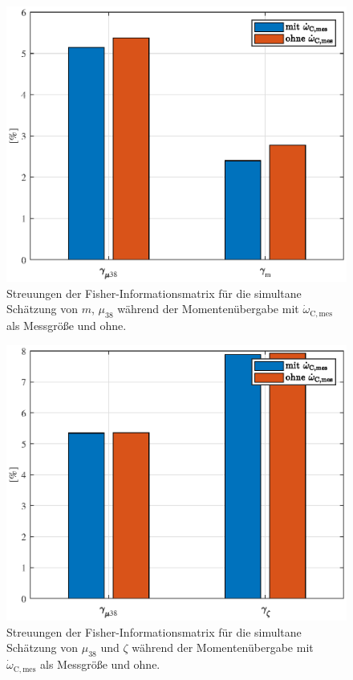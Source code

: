 \begin{figure}[ht]
  \centering
 \includegraphics[scale=0.9]{figures/03_Sensitivitaetsanalyse/03_Fisher_Info/Muebergabe/m_mu38.eps}
  \caption{Streuungen der Fisher-Informationsmatrix für die simultane Schätzung von $m$, $\mu_{38}$ während der Momentenübergabe mit $\dot{\omega}_\mathrm{C,mes}$ als Messgröße und ohne.}
\end{figure} 

\begin{figure}[ht]
  \centering
 \includegraphics[scale=0.9]{figures/03_Sensitivitaetsanalyse/03_Fisher_Info/Muebergabe/mu38_zeta.eps}
  \caption{Streuungen der Fisher-Informationsmatrix für die simultane Schätzung von $\mu_{38}$ und $\zeta$ während der Momentenübergabe mit $\dot{\omega}_\mathrm{C,mes}$ als Messgröße und ohne.}
\end{figure} 

